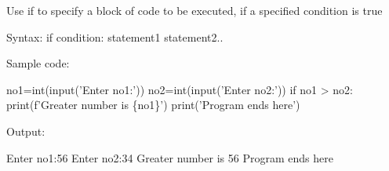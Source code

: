\setlength{\columnsep}{3pt}
\begin{flushleft}

	Use if to specify a block of code to be executed, if a specified condition is true
	
	\begin{tcolorbox}[breakable,notitle,boxrule=1pt,colback=pink,colframe=pink]
		\color{black}
		\font=8pt
		Syntax: 
		\newline
		if condition:
 \newline
		\hphantom{} \hphantom{}  statement1 \newline
		\hphantom{} \hphantom{}  statement2..
		\font=4pt
	\end{tcolorbox}

	Sample code:
	\begin{tcolorbox}[breakable,notitle,boxrule=-0pt,colback=code,colframe=code]
		\color{white}
		\font=8pt
			no1=int(input('Enter no1:')) \newline
			no2=int(input('Enter no2:')) \newline
			\newline
			if no1 > no2: \newline
			\hphantom{} \hphantom{}	print(f'Greater number is \{no1\}') \newline
			\newline
			print('Program ends here')
		\font=4pt
	\end{tcolorbox}
	
	Output:
	\begin{tcolorbox}[breakable,notitle,boxrule=-0pt,colback=output,colframe=output]
		\color{black}
		Enter no1:56 \newline
		Enter no2:34 \newline
		Greater number is 56 \newline
		Program ends here
		\font=4pt
	\end{tcolorbox}
			

	
	
	
\end{flushleft}

\newpage


